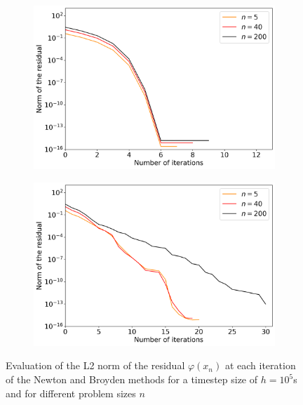 \begin{figure}[H]
	\centering
	\begin{subfigure}{0.45\textwidth}
		\centering
		\includegraphics[width=1\textwidth]{images/NewtonIterationConvergenceDT1e5_DifferentSizes_Analytic.png}
	\end{subfigure}
	\begin{subfigure}{0.45\textwidth}
		\centering
		\includegraphics[width=1\textwidth]{images/NewtonIterationConvergenceDT1e5_DifferentSizes_Broyden.png}
	\end{subfigure}
	\caption{Evaluation of the L2 norm of the residual $\varphi(x_n)$ at each iteration of the Newton and Broyden methods for a timestep size of $h=10^5$s and for different problem sizes $n$}
	\label{fig:convergenceNewtonAndBroydenDifferentSizes}
\end{figure}

